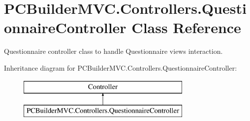 \hypertarget{class_p_c_builder_m_v_c_1_1_controllers_1_1_questionnaire_controller}{}\section{P\+C\+Builder\+M\+V\+C.\+Controllers.\+Questionnaire\+Controller Class Reference}
\label{class_p_c_builder_m_v_c_1_1_controllers_1_1_questionnaire_controller}


Questionnaire controller class to handle Questionnaire views interaction.  


Inheritance diagram for P\+C\+Builder\+M\+V\+C.\+Controllers.\+Questionnaire\+Controller\+:\begin{figure}[H]
\begin{center}
\leavevmode
\includegraphics[height=2.000000cm]{class_p_c_builder_m_v_c_1_1_controllers_1_1_questionnaire_controller}
\end{center}
\end{figure}

